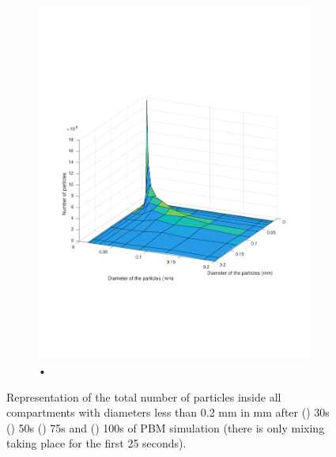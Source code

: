 \documentclass[preprint,11pt,authoryear]{elsarticle}
\begin{document}
\begin{figure}[H]
\begin{subfigure}{.5\textwidth}
\includegraphics[scale=0.45]{rslts-PBM_100s_psd.pdf}
\caption{•}
\label{fig:100s}
\end{subfigure}
\caption{ Representation of the total number of particles inside all compartments with diameters less than 0.2 mm 
in mm after () 30s () 50s () 75s and
 () 100s of PBM simulation (there is only mixing taking place for the first 25 seconds).}
\label{fig:rslts_PBM_d50_plots}
\end{figure}   
\end{document}
